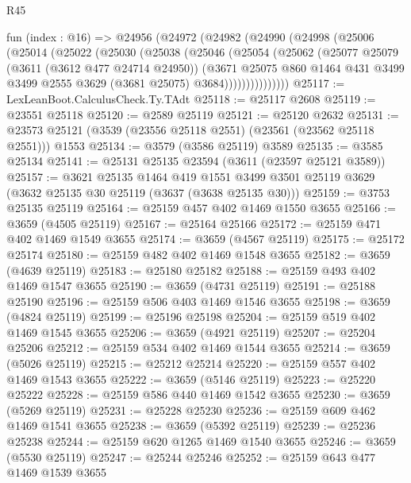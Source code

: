 \begin{lexlean}{R45}
\begin{coremodule}
    fun (index : @16) =>
    @24956
      (@24972
        (@24982
          (@24990
            (@24998
              (@25006
                (@25014
                  (@25022
                    (@25030
                      (@25038
                        (@25046
                          (@25054
                            (@25062
                              (@25077
                                @25079
                                (@3611 (@3612 @477 @24714 @24950))
                                (@3671
                                  @25075
                                  @860
                                  @1464
                                  @431
                                  @3499
                                  @3499
                                  @2555
                                  @3629
                                  (@3681 @25075)
                                  @3684)))))))))))))))
@25117 := LexLeanBoot.CalculusCheck.Ty.TAdt
@25118 := @25117 @2608
@25119 := @23551 @25118
@25120 := @2589 @25119
@25121 := @25120 @2632
@25131 := @23573 @25121 (@3539 (@23556 @25118 @2551) (@23561 (@23562 @25118 @2551))) @1553
@25134 := @3579 (@3586 @25119) @3589
@25135 := @3585 @25134
@25141 := @25131 @25135 @23594 (@3611 (@23597 @25121 @3589))
@25157 := @3621
    @25135
    @1464
    @419
    @1551
    @3499
    @3501
    @25119
    @3629
    (@3632 @25135 @30 @25119 (@3637 (@3638 @25135 @30)))
@25159 := @3753 @25135 @25119
@25164 := @25159 @457 @402 @1469 @1550 @3655
@25166 := @3659 (@4505 @25119)
@25167 := @25164 @25166
@25172 := @25159 @471 @402 @1469 @1549 @3655
@25174 := @3659 (@4567 @25119)
@25175 := @25172 @25174
@25180 := @25159 @482 @402 @1469 @1548 @3655
@25182 := @3659 (@4639 @25119)
@25183 := @25180 @25182
@25188 := @25159 @493 @402 @1469 @1547 @3655
@25190 := @3659 (@4731 @25119)
@25191 := @25188 @25190
@25196 := @25159 @506 @403 @1469 @1546 @3655
@25198 := @3659 (@4824 @25119)
@25199 := @25196 @25198
@25204 := @25159 @519 @402 @1469 @1545 @3655
@25206 := @3659 (@4921 @25119)
@25207 := @25204 @25206
@25212 := @25159 @534 @402 @1469 @1544 @3655
@25214 := @3659 (@5026 @25119)
@25215 := @25212 @25214
@25220 := @25159 @557 @402 @1469 @1543 @3655
@25222 := @3659 (@5146 @25119)
@25223 := @25220 @25222
@25228 := @25159 @586 @440 @1469 @1542 @3655
@25230 := @3659 (@5269 @25119)
@25231 := @25228 @25230
@25236 := @25159 @609 @462 @1469 @1541 @3655
@25238 := @3659 (@5392 @25119)
@25239 := @25236 @25238
@25244 := @25159 @620 @1265 @1469 @1540 @3655
@25246 := @3659 (@5530 @25119)
@25247 := @25244 @25246
@25252 := @25159 @643 @477 @1469 @1539 @3655

\end{coremodule}
\end{lexlean}
